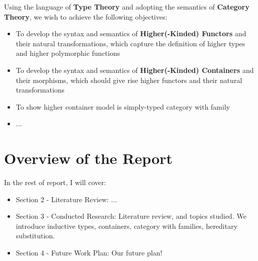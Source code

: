 Using the language of \textbf{Type Theory} and adopting the semantics of \textbf{Category Theory}, we wish to achieve the following objectives:

\begin{itemize}
  \item{To develop the syntax and semantics of \textbf{Higher(-Kinded) Functors} and their natural transformations, which capture the definition of higher types and higher polymorphic functions}
  \item{To develop the syntax and semantics of \textbf{Higher(-Kinded) Containers} and their morphisms, which should give rise higher functors and their natural transformations}
  \item{To show higher container model is simply-typed category with family}
  \item{...}
\end{itemize}

\section{Overview of the Report}

In the rest of report, I will cover:
\begin{itemize}
  \item{Section 2 - Literature Review: ...}
  \item{Section 3 - Conducted Research: Literature review, and topics studied. We introduce inductive types, containers, category with families, hereditary substitution.}
  \item{Section 4 - Future Work Plan: Our future plan!}
\end{itemize}

